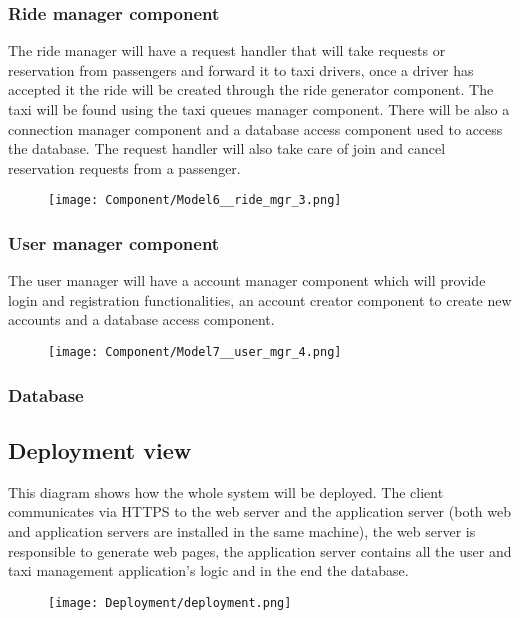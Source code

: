 	\subsubsection{Ride manager component}
		The ride manager will have a request handler that will take requests or reservation from passengers and forward it to taxi drivers, once a driver has accepted it the ride will be created through the ride generator component. The taxi will be found using the taxi queues manager component. There will be also a connection manager component and a database access component used to access the database.
		The request handler will also take care of join and cancel reservation requests from a passenger. 
		\begin{figure}[h!]
			\centering
			\texttt{[image: Component/Model6\_\_ride\_mgr\_3.png]}
		\end{figure}
		\newpage

	\subsubsection{User manager component}
		The user manager will have a account manager component which will provide login and registration functionalities, an account creator component to create new accounts and a database access component.
		\begin{figure}[h!]
			\centering
			\texttt{[image: Component/Model7\_\_user\_mgr\_4.png]}
		\end{figure}
		\newpage
	
	\subsubsection{Database}
	\begin{figure}[h!]
		\centering
	\end{figure}
	\newpage		

\subsection{Deployment view}
This diagram shows how the whole system will be deployed.
The client communicates via HTTPS to the web server and the application server (both web and application servers are installed in the same machine), the web server is responsible to generate web pages, the application server contains all the user and taxi management application's logic and in the end the database.
	\begin{figure}[h!]
		\centering
		\texttt{[image: Deployment/deployment.png]}
	\end{figure}
	\newpage

